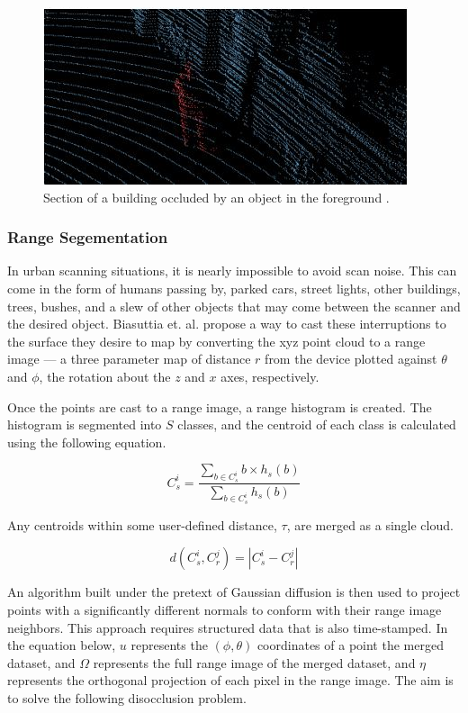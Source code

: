 \documentclass[12pt]{drexelthesis}
\let\Oldsubsubsection\subsubsection
\renewcommand{\subsubsection}{\FloatBarrier\Oldsubsubsection}
\begin{document}
\begin{figure}[!ht]
	\centering
		\includegraphics{occluded_man.jpg}
	\caption[Demonstration of occlusion]{\centering Section of a building occluded by an object in the foreground \cite{RN13}.}
\end{figure}

\subsubsection{Range Segementation}
\label{subsubsec:rangeseg}
In urban scanning situations, it is nearly impossible to avoid scan noise. This can come in the form of humans passing by, parked cars, street lights, other buildings, trees, bushes, and a slew of other objects that may come between the scanner and the desired object. Biasuttia et. al. propose a way to cast these interruptions to the surface they desire to map by converting the xyz point cloud to a range image --- a three parameter map of distance $r$ from the device plotted against $\theta$ and $\phi$, the rotation about the $z$ and $x$ axes, respectively.

Once the points are cast to a range image, a range histogram is created. The histogram is segmented into $S$ classes, and the centroid of each class is calculated using the following equation.

\begin{equation}
	C_{s}^{i} = \frac{\sum_{b\in C_{s}^{i}} b  \times h_{s}(b)}{\sum_{b\in C_{s}^{i}}h_{s}(b)}
\end{equation}

Any centroids within some user-defined distance, $\tau$, are merged as a single cloud.

\begin{equation}
	d(C_{s}^{i}, C_{r}^{j}) = |C_{s}^{i} - C_{r}^{j}|
\end{equation}

An algorithm built under the pretext of Gaussian diffusion is then used to project points with a significantly different normals to conform with their range image neighbors. This approach requires structured data that is also time-stamped. In the equation below, $u$ represents the $(\phi, \theta)$ coordinates of a point the merged dataset, and $\Omega$  represents the full range image of the merged dataset, and $\eta$ represents the orthogonal projection of each pixel in the range image. The aim is to solve the following disocclusion problem.
\end{document}
